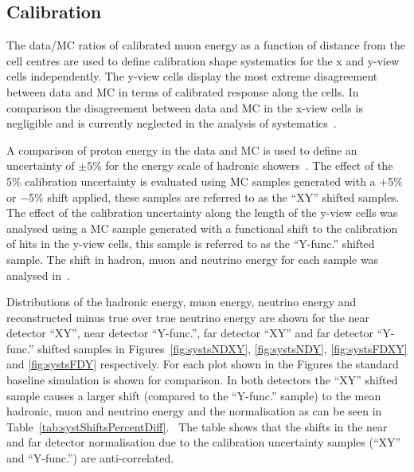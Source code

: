 \subsection{Calibration}\label{sec:calibsysts}

The data/MC ratios of calibrated muon energy as a function of distance
from the cell centres are used to define calibration shape
systematics for the x and y-view cells independently. 
The y-view cells display the most extreme disagreement between data and
MC in terms of calibrated response along the cells. In comparison the
disagreement between data and MC in the x-view cells is negligible and
is currently neglected in the analysis of systematics~\cite{dianaAbsCal}.

A comparison of proton energy in the data and MC is
used to define an uncertainty of $\pm 5\%$  for the energy scale of
hadronic showers~\cite{SusanProtondEdxCalib}. 
The effect of the 5\% calibration uncertainty is evaluated using MC
samples generated with a $+$5\% or $-$5\% shift applied, these samples
are referred to as the ``XY'' shifted samples.
The effect of the calibration uncertainty along the length of the
y-view cells was analysed using a MC sample generated with a
functional shift to the calibration of hits in the y-view cells, this
sample is referred to as the ``Y-func.'' shifted sample.
The shift in hadron, muon and neutrino energy for each sample was
analysed in~\cite{LukeCalibSystAna}.

Distributions of the hadronic energy, muon energy, neutrino energy and 
reconstructed minus true over true neutrino energy are shown for the
near detector ``XY'', near detector ``Y-func.'', far
detector ``XY'' and far detector ``Y-func.'' shifted samples in
Figures~\ref{fig:systsNDXY}, \ref{fig:systsNDY}, \ref{fig:systsFDXY}
and \ref{fig:systsFDY} respectively. 
For each plot shown in the Figures the standard baseline simulation is
shown for comparison.  
In both detectors the ``XY'' shifted sample causes a larger shift
(compared to the ``Y-func.'' sample) to
the mean {hadronic, muon and neutrino} energy and the normalisation as
can be seen in
Table~\ref{tab:systShiftsPercentDiff}.~\cite{LukeCalibSystAna} 
The table shows that the shifts in the near and far detector
normalisation due to the calibration uncertainty samples (``XY'' and
``Y-func.'') are anti-correlated.  


